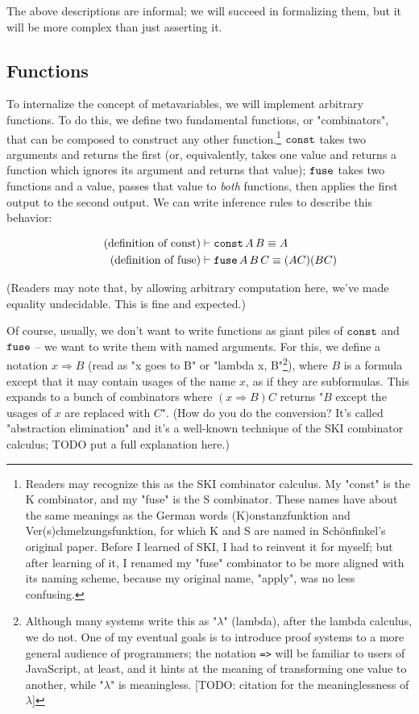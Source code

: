 \documentclass{article}
\begin{document}
  The above descriptions are informal; we will succeed in formalizing them, but it will be more complex than just asserting it.
  
  \subsection{Functions}

  To internalize the concept of metavariables, we will implement arbitrary functions. To do this, we define two fundamental functions, or "combinators", that can be composed to construct any other function.\footnote{Readers may recognize this as the SKI combinator calculus. My "const" is the K combinator, and my "fuse" is the S combinator. These names have about the same meanings as the German words (K)onstanzfunktion and Ver(s)chmelzungsfunktion, for which K and S are named in Schönfinkel's original paper. Before I learned of SKI, I had to reinvent it for myself; but after learning of it, I renamed my "fuse" combinator to be more aligned with its naming scheme, because my original name, "apply", was no less confusing.} $\operatorname{\texttt{const}}$ takes two arguments and returns the first (or, equivalently, takes one value and returns a function which ignores its argument and returns that value); $\operatorname{\texttt{fuse}}$ takes two functions and a value, passes that value to \emph{both} functions, then applies the first output to the second output. We can write inference rules to describe this behavior:
  
  \begin{align*}
    \tag{definition of const}
    &\vdash \operatorname{\texttt{const}} A\, B \equiv A \\
    \tag{definition of fuse}
    &\vdash \operatorname{\texttt{fuse}} A\, B\, C \equiv (AC)(BC)
  \end{align*}
  
  (Readers may note that, by allowing arbitrary computation here, we've made equality undecidable. This is fine and expected.)

  \newcommand{\nameabst}[1]{#1 \Rightarrow}

  Of course, usually, we don't want to write functions as giant piles of $\operatorname{\texttt{const}}$ and $\operatorname{\texttt{fuse}}$ – we want to write them with named arguments. For this, we define a notation $\nameabst{x} B$ (read as "x goes to B" or "lambda x, B"\footnote{Although many systems write this as "$\lambda$" (lambda), after the lambda calculus, we do not. One of my eventual goals is to introduce proof systems to a more general audience of programmers; the notation \texttt{=>} will be familiar to users of JavaScript, at least, and it hints at the meaning of transforming one value to another, while "$\lambda$" is meaningless. [TODO: citation for the meaninglessness of $\lambda$]}), where $B$ is a formula except that it may contain usages of the name $x$, as if they are subformulas. This expands to a bunch of combinators where $(\nameabst{x} B) C$ returns "$B$ except the usages of $x$ are replaced with $C$". (How do you do the conversion? It's called "abstraction elimination" and it's a well-known technique of the SKI combinator calculus; TODO put a full explanation here.)
  
\end{document}
